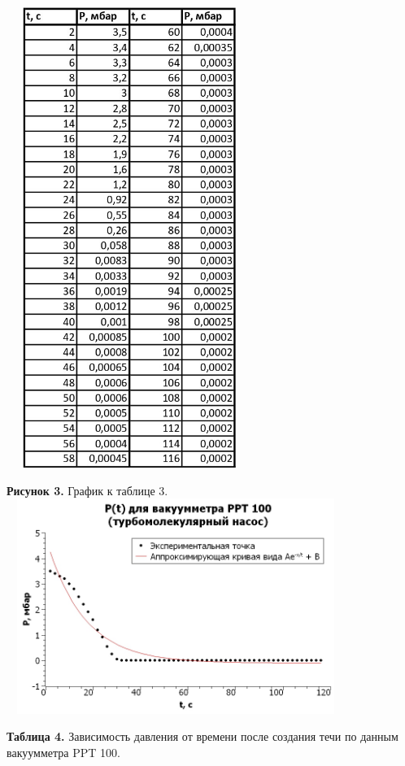 \documentclass[15pt,a5paper,reqno]{article}
\begin{document}
    \centering\includegraphics[width = 8cm, height = 15cm]{Турбомолекулярный насос, PPT 100_page-0001.jpg}
    
    \newpage
    \noindent\textbf{Рисунок 3.} График к таблице 3.
    \includegraphics[width = 11cm, height = 7cm]{Турбомолекулярный насос, PPT 100.jpg}
    
    \newpage
    \noindent\textbf{Таблица 4.} Зависимость давления от времени после создания течи по данным вакуумметра PPT 100.
    
\end{document}
